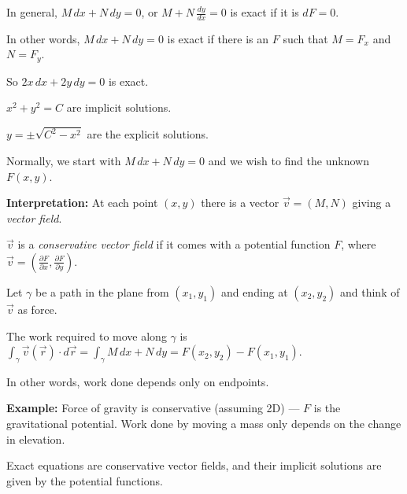 \documentclass[10pt,aspectratio=169]{beamer}
\begin{document}
\begin{frame}

In general, \quad
$M \, dx + N \, dy = 0$, \quad
or
\quad
$M + N \, \frac{dy}{dx} = 0$ \quad
is exact if it is \quad $dF = 0$.

\medskip
\pause

In other words, $M \, dx + N \, dy = 0$ is exact if there is an $F$ such that $M = F_x$ and $N=F_y$.

\medskip
\pause

So 
\quad
$2x \, dx + 2y \, dy = 0$
\quad
is exact.

\medskip
\pause

$x^2+y^2=C$ are implicit solutions.

\medskip
\pause

$y = \pm \sqrt{C^2-x^2}$ are the explicit solutions.

\medskip
\pause

Normally, we start with $M \, dx + N \, dy = 0$ and we wish to find the
unknown $F(x,y)$.
\end{frame}

\begin{frame}
\textbf{Interpretation:}
At each point $(x,y)$ there is a vector $\vec{v} = (M,N)$ giving a \emph{vector
field}.

\medskip
\pause

$\vec{v}$ is a \emph{conservative vector field} if it comes with a potential
function $F$, where
$\vec{v} = \left( \frac{\partial F}{\partial x} ,\frac{\partial F}{\partial
y} \right)$.

\medskip
\pause

Let $\gamma$ be a path in the plane from $(x_1,y_1)$ and ending at
$(x_2,y_2)$ and think of $\vec{v}$ as force.

\medskip

The work required to move along $\gamma$ is
\quad
$\displaystyle
\int_\gamma \vec{v}(\vec{r}) \cdot d\vec{r}
=
\int_\gamma M \, dx + N \, dy
=
F(x_2,y_2) - F(x_1,y_1)$.

\medskip
\pause

In other words, work done depends only on endpoints.

\medskip
\pause

\textbf{Example:} Force of gravity is conservative (assuming 2D)
--- $F$ is the gravitational potential.
\pause
Work done by moving a mass only depends on the change in elevation.

\medskip
\pause

Exact equations are conservative vector fields, and
their
implicit solutions are given by the potential functions.

\end{frame}
\end{document}
